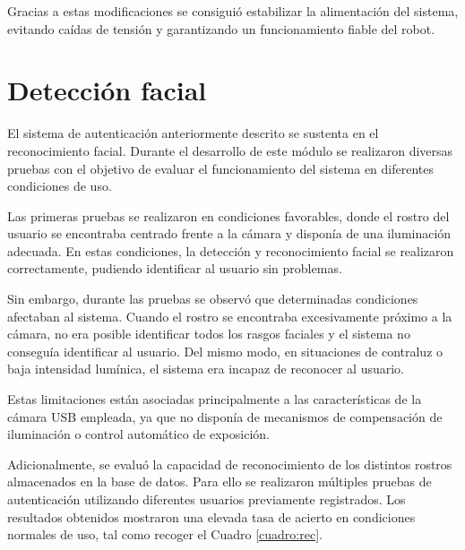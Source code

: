\vspace{0.2cm}

Gracias a estas modificaciones se consiguió estabilizar la alimentación del sistema, evitando caídas de tensión y garantizando un funcionamiento fiable del robot.


\section{Detección facial}
\label{sec:Detección facial}

El sistema de autenticación anteriormente descrito se sustenta en el reconocimiento facial. Durante el desarrollo de este módulo se realizaron diversas pruebas con el objetivo de evaluar el funcionamiento del sistema en diferentes condiciones de uso.

\vspace{0.2cm}

Las primeras pruebas se realizaron en condiciones favorables, donde el rostro del usuario se encontraba centrado frente a la cámara y disponía de una iluminación adecuada. En estas condiciones, la detección y reconocimiento facial se realizaron correctamente, pudiendo identificar al usuario sin problemas.

\vspace{0.2cm}

Sin embargo, durante las pruebas se observó que determinadas condiciones afectaban al sistema.
Cuando el rostro se encontraba excesivamente próximo a la cámara, no era posible identificar todos los rasgos faciales y el sistema no conseguía identificar al usuario. Del mismo modo, en situaciones de contraluz o baja intensidad lumínica, el sistema era incapaz de reconocer al usuario.

\vspace{0.2cm}

Estas limitaciones están asociadas principalmente a las características de la cámara USB empleada, ya que no disponía de mecanismos de compensación de iluminación o control automático de exposición.

\vspace{0.2cm}

Adicionalmente, se evaluó la capacidad de reconocimiento de los distintos rostros almacenados en la base de datos. Para ello se realizaron múltiples pruebas de autenticación utilizando diferentes usuarios previamente registrados. Los resultados obtenidos mostraron una elevada tasa de acierto en condiciones normales de uso, tal como recoger el Cuadro \ref{cuadro:rec}.


